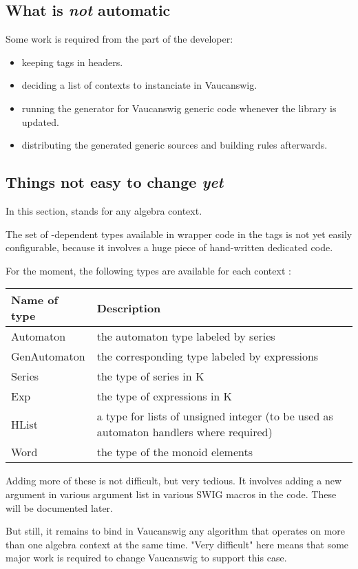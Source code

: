 \subsection{What is \emph{not} automatic}

Some work is required from the part of the developer:
\begin{itemize}
\item keeping  tags in \Vauc headers.

\item deciding a list of contexts to instanciate in Vaucanswig.

\item running the generator for Vaucanswig generic code whenever
  the \Vauc library is updated.

\item distributing the generated generic sources and building rules
  afterwards.
\end{itemize}

\subsection{Things not easy to change \emph{yet}}

In this section,  stands for any algebra context.

The set of  -dependent types available in wrapper code in the
 tags is not yet easily configurable, because it
involves a huge piece of hand-written dedicated code.

For the moment, the following types are available for each
context :

\begin{tabular}{|l|p{.6\linewidth}|}
  \hline
   Name of type   & Description\\
  \hline
     Automaton	& the automaton type labeled by series \\
     GenAutomaton& the corresponding type labeled by expressions \\
     Series	& the type of series in K \\
     Exp	& the type of expressions in K \\
     HList	& a type for lists of unsigned integer
                  (to be used as automaton handlers where required) \\
     Word	& the type of the monoid elements \\
  \hline
\end{tabular}

Adding more of these is not difficult, but very tedious. It involves
adding a new argument in various argument list in various SWIG macros
in the code. These will be documented later.

But still, it remains  to bind in Vaucanswig
any algorithm that operates on more than one algebra context at the
same time. "Very difficult" here means that some major work is
required to change Vaucanswig to support this case.



